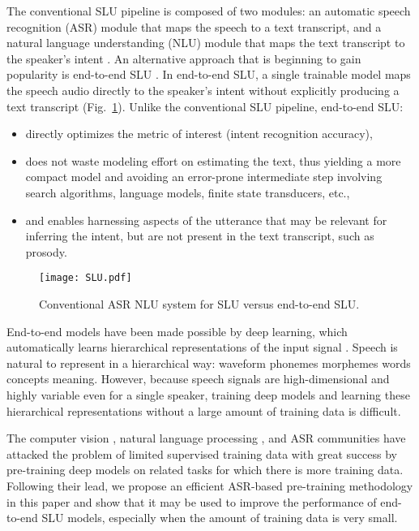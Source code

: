 \documentclass[a4paper]{article}
\begin{document}
The conventional SLU pipeline is composed of two modules: an automatic speech recognition (ASR) module that maps the speech to a text transcript, and a natural language understanding (NLU) module that maps the text transcript to the speaker's intent \cite{Mesnil2015, Coucke,Gorin1997}. An alternative approach that is beginning to gain popularity is end-to-end SLU \cite{Qian2017, Serdyuk2018, Chen2018, Haghani2018, Renkens2018}. 
In end-to-end SLU, a single trainable model maps the speech audio directly to the speaker's intent without explicitly producing a text transcript (Fig.\ \ref{fig:SLU_diagram}). Unlike the conventional SLU pipeline, end-to-end SLU:
\begin{itemize}
    \item directly optimizes the metric of interest (intent recognition accuracy),
    \item does not waste modeling effort on estimating the text, thus yielding a more compact model and avoiding an error-prone intermediate step involving search algorithms, language models, finite state transducers, etc.,
    \item and enables harnessing aspects of the utterance that may be relevant for inferring the intent, but are not present in the text transcript, such as prosody.
\end{itemize}
\begin{figure}
    \centering
    \texttt{[image: SLU.pdf]}
    \caption{Conventional ASR  NLU system for SLU versus end-to-end SLU.}
    \label{fig:SLU_diagram}
\end{figure}

End-to-end models have been made possible by deep learning, which automatically learns hierarchical representations of the input signal \cite{Goodfellow-et-al-2016-Book,lecun1998gradient, Krizhevsky2012,Graves2014, Amodei2015}. Speech is natural to represent in a hierarchical way: waveform  phonemes  morphemes  words  concepts  meaning. However, because speech signals are high-dimensional and highly variable even for a single speaker, training deep models and learning these hierarchical representations without a large amount of training data is difficult.

The computer vision \cite{Yosinski2014, simonyan2014very}, natural language processing \cite{dai2015semi, howard2018universal, Radford, sanh2018hmtl, devlin2018bert}, and ASR \cite{wang2015, IEEEexample:intro1, Kunze, Ghahremani2017} communities have attacked the problem of limited supervised training data with great success by pre-training deep models on related tasks for which there is more training data.
Following their lead, we propose an efficient ASR-based pre-training methodology in this paper and show that it may be used to improve the performance of end-to-end SLU models, especially when the amount of training data is very small.
\end{document}
